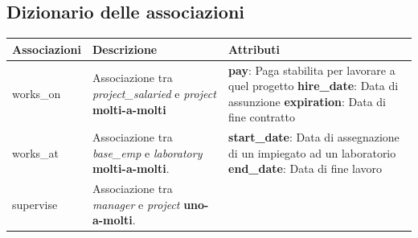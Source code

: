 \newpage
\subsection{Dizionario delle associazioni}
\begin{tabular}{@{}| p{} | p{} | p{} |}
	\hline
	Associazioni       & Descrizione                                                                               & Attributi \\
	\hline
	works\_on          & \begin{minipage}[t]{0.4\textwidth}
		                     \raggedright
		                     Associazione tra \textit{project\_salaried} e \textit{project} \textbf{molti-a-molti}
	                     \end{minipage}     & \begin{minipage}[t]{0.3\textwidth}
		                                          \raggedright
		                                          \textbf{pay}: Paga stabilita per lavorare a quel progetto\sskip
		                                          \textbf{hire\_date}: Data di assunzione\sskip
		                                          \textbf{expiration}: Data di fine contratto
	                                          \end{minipage}
	\\[70pt]
	\hline
	works\_at          & \begin{minipage}[t]{0.4\textwidth}
		                     \raggedright
		                     Associazione tra \textit{base\_emp} e \textit{laboratory} \textbf{molti-a-molti}.
	                     \end{minipage}
	                   & \begin{minipage}[t]{0.3\textwidth}
		                     \raggedright
		                     \textbf{start\_date}: Data di assegnazione di un impiegato ad un laboratorio\sskip
		                     \textbf{end\_date}: Data di fine lavoro
	                     \end{minipage}                     \\[55pt]
	\hline
	supervise          & \begin{minipage}[t]{0.4\textwidth}
		                     \raggedright
		                     Associazione tra \textit{manager} e \textit{project} \textbf{uno-a-molti}.
	                     \end{minipage}
	                   &                                                                                                       \\[15pt]

\end{tabular}
